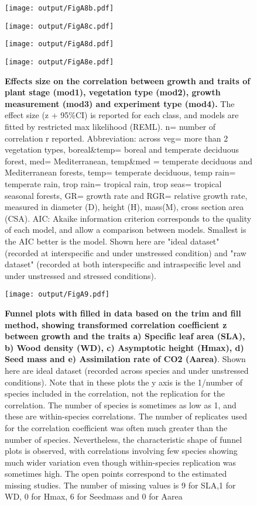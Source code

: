 \documentclass[a4paper]{article}\usepackage[]{graphicx}\usepackage[]{color}
\begin{document}
\begin{appendices}
\begin{figure}[htbp]
\centering
\texttt{[image: output/FigA8b.pdf]}
\end{figure}

\begin{figure}[htbp]
\centering
\texttt{[image: output/FigA8c.pdf]}
\end{figure}

\begin{figure}[htbp]
\texttt{[image: output/FigA8d.pdf]}
\centering
\end{figure}

\begin{figure}[htbp]
\centering
\texttt{[image: output/FigA8e.pdf]}
\caption{\textbf{Effects size on the correlation between growth and traits of plant stage (mod1), vegetation type (mod2), growth measurement (mod3) and experiment type (mod4).} The effect size (z + 95\%CI) is reported for each class, and models are fitted by restricted max likelihood (REML). n= number of correlation r reported. Abbreviation: across veg= more than 2 vegetation types, boreal\&temp= boreal and temperate deciduous forest, med= Mediterranean,  temp\&med = temperate deciduous and Mediterranean forests, temp= temperate deciduous, temp rain= temperate rain, trop rain= tropical rain, trop seas= tropical seasonal forests, GR= growth rate and RGR= relative growth rate, measured in diameter (D), height (H), mass(M), cross section area (CSA). AIC: Akaike information criterion corresponds to the quality of each model, and allow a comparison between models. Smallest is the AIC better is the model. Shown here are "ideal dataset" (recorded at interspecific and under unstressed condition) and "raw dataset" (recorded at both interspecific and intraspecific level and under unstressed and stressed conditions).}
\label{FigA8}
\end{figure}

\begin{figure}[htbp]
\centering
\texttt{[image: output/FigA9.pdf]}
\caption{\textbf{Funnel plots with filled in data based on the trim and fill method, showing transformed correlation coefficient z between growth and the traits a) Specific leaf area (SLA), b) Wood density (WD), c) Asymptotic height (Hmax), d) Seed mass and e) Assimilation rate of CO2 (Aarea)}. Shown here are ideal dataset (recorded across species and under unstressed conditions).  Note that in these plots the y axis is the 1/number of species included in the correlation, not the replication for the correlation. The number of species is sometimes as low as 1, and these are within-species correlations. The number of replicates used for the correlation coefficient was often much greater than the number of species. Nevertheless, the characteristic shape of funnel plots is observed, with correlations involving few species showing much wider variation even though within-species replication was sometimes high. The open points correspond to the estimated missing studies. The number of missing values is 9 for SLA,1 for WD, 0 for Hmax, 6 for Seedmass and 0 for Aarea}


\end{figure}
\end{appendices}
\end{document}
